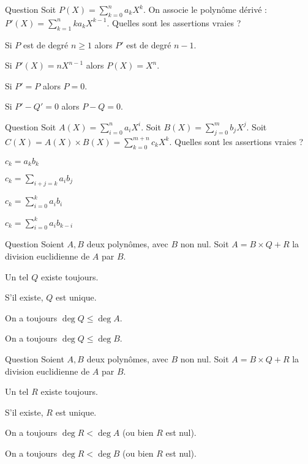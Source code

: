 \begin{multi}[multiple,feedback=
{C'est comme pour les primitives, il ne faut pas oublier la constante :
Si \(P'=Q'\) alors \(P=Q +c\).
}]{Question}
Soit \(P(X) = \sum_{k=0}^n a_k X^k\). On associe le polynôme dérivé :
\(P'(X) = \sum_{k=1}^n ka_k X^{k-1}\). Quelles sont les assertions vraies ?

    \item* Si \(P\) est de degré \(n\ge1\) alors \(P'\) est de degré \(n-1\).
    \item Si \(P'(X) = nX^{n-1}\) alors \(P(X) = X^n\).
    \item* Si \(P'=P\) alors \(P=0\).
    \item Si \(P'-Q'=0\) alors \(P-Q=0\).
\end{multi}


\begin{multi}[multiple,feedback=
{La formule (à connaître) est 
\[c_k = \sum_{i+j=k} a_ib_j = \sum_{i=0}^k a_ib_{k-i}.\]
}]{Question}
Soit \(A(X) = \sum_{i=0}^n a_i X^i\).
Soit \(B(X) = \sum_{j=0}^m b_j X^j\).
Soit \(C(X) = A(X) \times B(X) = \sum_{k=0}^{m+n} c_k X^k\).
Quelles sont les assertions vraies ?

    \item \(c_k = a_k b_k\)
    \item* \(c_k = \sum_{i+j=k} a_ib_j\)
    \item \(c_k = \sum_{i=0}^k a_ib_i\)
    \item* \(c_k = \sum_{i=0}^k a_ib_{k-i}\)
\end{multi}


\begin{multi}[multiple,feedback=
{La division euclidienne \(A = B \times Q + R\) existe toujours, \(Q\) et \(R\) sont uniques et bien sûr \(\deg Q \le \deg A\).
}]{Question}
Soient \(A,B\) deux polynômes, avec \(B\) non nul. 
Soit \(A = B \times Q + R\) la division euclidienne de \(A\) par \(B\).

    \item* Un tel \(Q\) existe toujours.
    \item* S'il existe, \(Q\) est unique.
    \item* On a toujours \(\deg Q \le \deg A\).
    \item On a toujours \(\deg Q \le \deg B\).
\end{multi}


\begin{multi}[multiple,feedback=
{La division euclidienne \(A = B \times Q + R\) existe toujours, \(Q\) et \(R\) sont uniques et par définition de la division euclidienne \(R\) est nul ou bien 
\(\deg R < \deg B\).
}]{Question}
Soient \(A,B\) deux polynômes, avec \(B\) non nul. 
Soit \(A = B \times Q + R\) la division euclidienne de \(A\) par \(B\).

    \item* Un tel \(R\) existe toujours.
    \item* S'il existe, \(R\) est unique.
    \item On a toujours \(\deg R < \deg A\) (ou bien \(R\) est nul).
    \item* On a toujours \(\deg R < \deg B\) (ou bien \(R\) est nul).
\end{multi}


